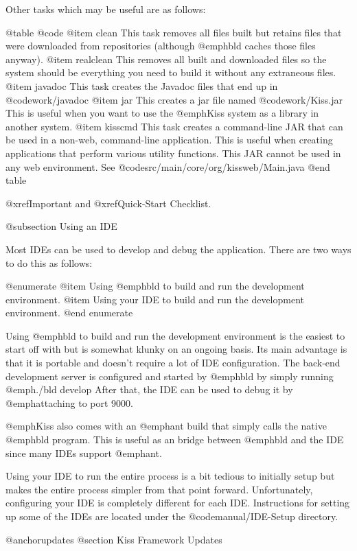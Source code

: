 Other tasks which may be useful are as follows:

@table @code
@item clean
This task removes all files built but retains files that were downloaded from
repositories (although @emph{bld} caches those files anyway).
@item realclean
This removes all built and downloaded files so the system should be everything
you need to build it without any extraneous files.
@item javadoc
This task creates the Javadoc files that end up in @code{work/javadoc}
@item jar
This creates a jar file named @code{work/Kiss.jar} This is useful when you want to use
the @emph{Kiss} system as a library in another system.
@item kisscmd
This task creates a command-line JAR that can be used in a non-web, command-line application.
This is useful when creating applications that perform various utility functions.  This
JAR cannot be used in any web environment.  See @code{src/main/core/org/kissweb/Main.java}
@end table

@xref{Important} and @xref{Quick-Start Checklist}.

@subsection Using an IDE

Most IDEs can be used to develop and debug the application.  There are two
ways to do this as follows:

@enumerate
@item
Using @emph{bld} to build and run the development environment.
@item
Using your IDE to build and run the development environment.
@end enumerate

Using @emph{bld} to build and run the development environment is the
easiest to start off with but is somewhat klunky on an ongoing basis.
Its main advantage is that it is portable and doesn't require a lot of
IDE configuration.  The back-end development server is configured and
started by @emph{bld} by simply running @emph{./bld develop} After
that, the IDE can be used to debug it by @emph{attaching} to port
9000.

@emph{Kiss} also comes with an @emph{ant} build that simply calls the
native @emph{bld} program.  This is useful as an bridge between
@emph{bld} and the IDE since many IDEs support @emph{ant}.

Using your IDE to run the entire process is a bit tedious to initially
setup but makes the entire process simpler from that point forward.
Unfortunately, configuring your IDE is completely different for each
IDE.  Instructions for setting up some of the IDEs are located under the
@code{manual/IDE-Setup} directory.


@anchor{updates} @section Kiss Framework Updates

